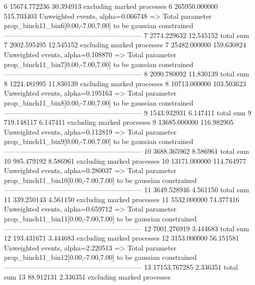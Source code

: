 6          15674.772236    30.394913       excluding marked processes    
6          265950.000000   515.703403      Unweighted events, alpha=0.066748
  => Total parameter prop_binch11_bin6[0.00,-7.00,7.00] to be gaussian constrained
------------------------------------------------------------
7          2774.229632     12.545152       total sum                     
7          2002.595495     12.545152       excluding marked processes    
7          25482.000000    159.630824      Unweighted events, alpha=0.108870
  => Total parameter prop_binch11_bin7[0.00,-7.00,7.00] to be gaussian constrained
------------------------------------------------------------
8          2090.780092     11.830139       total sum                     
8          1224.481995     11.830139       excluding marked processes    
8          10713.000000    103.503623      Unweighted events, alpha=0.195163
  => Total parameter prop_binch11_bin8[0.00,-7.00,7.00] to be gaussian constrained
------------------------------------------------------------
9          1543.932931     6.147411        total sum                     
9          719.148117      6.147411        excluding marked processes    
9          13685.000000    116.982905      Unweighted events, alpha=0.112819
  => Total parameter prop_binch11_bin9[0.00,-7.00,7.00] to be gaussian constrained
------------------------------------------------------------
10         3688.365962     8.586961        total sum                     
10         985.479192      8.586961        excluding marked processes    
10         13171.000000    114.764977      Unweighted events, alpha=0.280037
  => Total parameter prop_binch11_bin10[0.00,-7.00,7.00] to be gaussian constrained
------------------------------------------------------------
11         3649.528946     4.561150        total sum                     
11         339.250143      4.561150        excluding marked processes    
11         5532.000000     74.377416       Unweighted events, alpha=0.659712
  => Total parameter prop_binch11_bin11[0.00,-7.00,7.00] to be gaussian constrained
------------------------------------------------------------
12         7001.276919     3.444683        total sum                     
12         193.431671      3.444683        excluding marked processes    
12         3153.000000     56.151581       Unweighted events, alpha=2.220513
  => Total parameter prop_binch11_bin12[0.00,-7.00,7.00] to be gaussian constrained
------------------------------------------------------------
13         17153.767285    2.336351        total sum                     
13         88.912131       2.336351        excluding marked processes    
